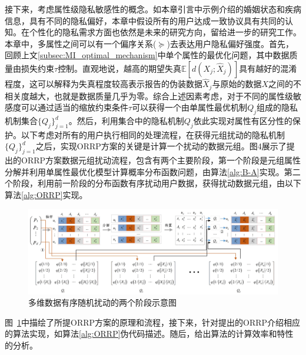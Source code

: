 接下来，考虑属性级隐私敏感性的概念。如本章引言中示例介绍的婚姻状态和疾病信息，具有不同的隐私偏好，本章中假设所有的用户达成一致协议具有共同的认知。在个性化的隐私需求\cite{murakami2019utility}方面也依然是未来的研究方向，留给进一步的研究工作。本章中，多属性之间可以有一个偏序关系($\succcurlyeq$)去表达用户隐私偏好强度。首先，回顾上文\ref{subsec:MI_optimal_mechanism}中单个属性的最优化问题，其中数据质量由损失约束$\tau$控制。直观地说，越高的期望失真$\mathbb{E}[d(X_j;\hat{X}_j)]$具有越好的混淆程度，这可以解释为失真程度较高表示报告的伪装数据$\hat{X}_j$与原始的数据$X$之间的不相关度越大，也就是数据质量几乎为零。综合上述因素考虑，对于不同的属性级敏感度可以通过适当的缩放约束条件$\tau$可以获得一个由单属性最优机制$Q_j$组成的隐私机制集合$\{Q_j\}_{j=1}^{d}$。然后，利用集合中的隐私机制$Q_j$依此实现对属性有区分性的保护。以下考虑对所有的用户执行相同的处理流程，在获得元组扰动的隐私机制$\{Q_j\}_{j=1}^{d}$之后，实现ORRP方案的关键是计算一个扰动的数据元组。图4展示了提出的ORRP方案数据元组扰动流程，包含有两个主要阶段，第一个阶段是元组属性分解并利用单属性最优化模型计算概率分布函数问题，由算法\ref{alg:B-A}实现。第二个阶段，利用前一阶段的分布函数有序扰动用户数据，获得扰动数据元组，由以下算法\ref{alg:ORRP}实现。

\begin{figure}[htbp]
	\centering
	\includegraphics[width = 0.99\linewidth]{./figures/chapter06/chapter06_4.jpg}
	\caption{多维数据有序随机扰动的两个阶段示意图}
	\label{fig:chapter06_Fig04}
\end{figure}


图~\ref{fig:chapter06_Fig04}中描绘了所提ORRP方案的原理和流程，接下来，针对提出的ORRP介绍相应的算法实现，如算法\ref{alg:ORRP}伪代码描述。随后，给出算法的计算效率和特性的分析。

